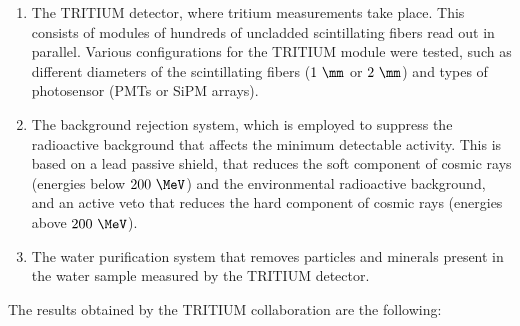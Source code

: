 \begin{enumerate}

\item{} The TRITIUM detector, where tritium measurements take place. This consists of modules of hundreds of uncladded scintillating fibers read out in parallel. Various configurations for the TRITIUM module were tested, such as different diameters of the scintillating fibers ($1~\mm$ or $2~\mm$) and types of photosensor (PMTs or SiPM arrays).

\item{} The background rejection system, which is employed to suppress the radioactive background that affects the minimum detectable activity. This is based on a lead passive shield, that reduces the soft component of cosmic rays (energies below $200~\MeV$) and the environmental radioactive background, and an active veto that reduces the hard component of cosmic rays (energies above $200~\MeV$).

\item{} The water purification system that removes particles and minerals present in the water sample measured by the TRITIUM detector.

\end{enumerate} 

The results obtained by the TRITIUM collaboration are the following:

